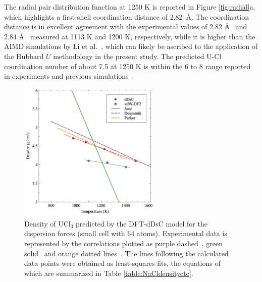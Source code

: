 \documentclass[preprint,3p,10pt,onecolumn,number,sort&compress]{elsarticle}
\begin{document}
{ 
The radial pair distribution function at 1250 K is reported in Figure \ref{fig:radial}a, which highlights a first-shell coordination distance of 2.82~\AA. The coordination distance is in excellent agreement with the experimental values of 2.82 \AA~\cite{Neilson} and 2.84 \AA~\cite{Okamoto} measured at 1113 K and 1200 K, respectively, while it is higher than the AIMD simulations by Li et al.~\cite{Li}, which can likely be ascribed to the application of the Hubbard $U$ methodology in the present study. The predicted U-Cl coordination number of about 7.5 at 1250 K is within the 6 to 8 range reported in experiments and previous simulations~\cite{Li,Neilson,Okamoto}. %
 

\begin{figure}[htb]
\centering
\includegraphics[width=0.6\textwidth]{fig5.jpg}
\caption{Density of UCl$_3$ predicted by the DFT-dDsC model for the dispersion forces (small cell with 64 atoms). Experimental data is represented by the correlations plotted as purple dashed~\cite{Desyatnik}, green solid~\cite{Janz1988} and orange dotted lines~\cite{Parker}. The lines following the calculated data points were obtained as least-squares fits, the equations of which are summarized in Table \ref{table:NaCldensityetc}.} %
\label{fig:UCl3density}
\end{figure}

}
\end{document}
